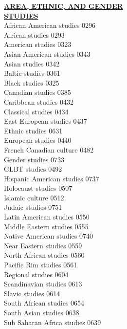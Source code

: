 \documentclass[9pt,twoside]{article}
\newcommand{\categoryheading}[1]{{\fontsize{8}{11}\selectfont \textbf{\uline{#1}}}}
\begin{document}
{\fontsize{8}{10}\selectfont
\setlength\columnsep{.7in}
\begin{multicols}{3}
\categoryheading{AREA, ETHNIC, AND GENDER \\
STUDIES} \\
African American studies \hfill 0296 \\
African studies \hfill 0293 \\
American studies \hfill 0323 \\
Asian American studies \hfill 0343 \\
Asian studies \hfill 0342 \\
Baltic studies \hfill 0361 \\
Black studies \hfill 0325 \\
Canadian studies \hfill 0385 \\
Caribbean studies \hfill 0432 \\
Classical studies \hfill 0434 \\
East European studies \hfill 0437 \\
Ethnic studies \hfill 0631 \\
European studies \hfill 0440 \\
French Canadian culture \hfill 0482 \\
Gender studies \hfill 0733 \\
GLBT studies \hfill 0492 \\
Hispanic American studies \hfill 0737 \\
Holocaust studies \hfill 0507 \\
Islamic culture \hfill 0512 \\
Judaic studies \hfill 0751 \\
Latin American studies \hfill 0550 \\
Middle Eastern studies \hfill 0555 \\
Native American studies \hfill 0740 \\
Near Eastern studies \hfill 0559 \\
North African studies \hfill 0560 \\
Pacific Rim studies \hfill 0561 \\
Regional studies \hfill 0604 \\
Scandinavian studies \hfill 0613 \\
Slavic studies \hfill 0614 \\
South African studies \hfill 0654 \\
South Asian studies \hfill 0638 \\
Sub Saharan Africa studies \hfill 0639 \\

\end{multicols}}
\end{document}
